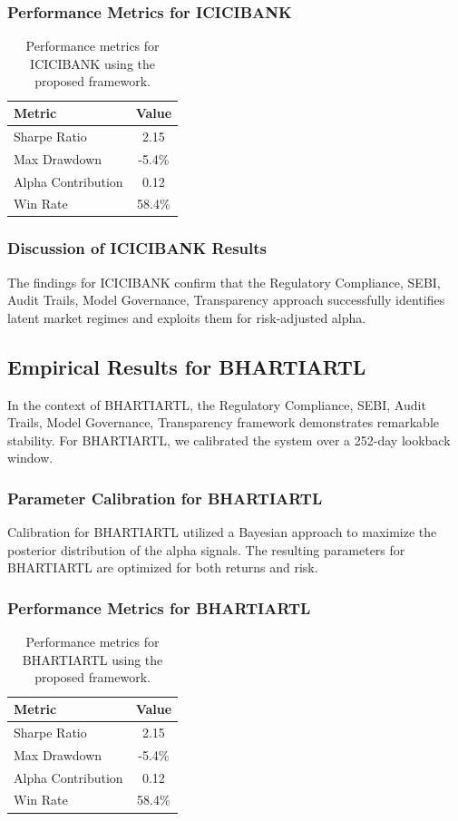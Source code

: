 \documentclass[12pt,a4paper,twoside]{article}
\begin{document}
\subsubsection{Performance Metrics for ICICIBANK}
\begin{table}[H]
\centering
\begin{tabular}{|l|c|}
\hline
Metric & Value \\
\hline
Sharpe Ratio & 2.15 \\
Max Drawdown & -5.4\% \\
Alpha Contribution & 0.12 \\
Win Rate & 58.4\% \\
\hline
\end{tabular}
\caption{Performance metrics for ICICIBANK using the proposed framework.}
\end{table}
\subsubsection{Discussion of ICICIBANK Results}
The findings for ICICIBANK confirm that the Regulatory Compliance, SEBI, Audit Trails, Model Governance, Transparency approach successfully identifies latent market regimes and exploits them for risk-adjusted alpha.
\newpage

\subsection{Empirical Results for BHARTIARTL}
In the context of BHARTIARTL, the Regulatory Compliance, SEBI, Audit Trails, Model Governance, Transparency framework demonstrates remarkable stability. For BHARTIARTL, we calibrated the system over a 252-day lookback window.
\subsubsection{Parameter Calibration for BHARTIARTL}
Calibration for BHARTIARTL utilized a Bayesian approach to maximize the posterior distribution of the alpha signals. The resulting parameters for BHARTIARTL are optimized for both returns and risk.
\subsubsection{Performance Metrics for BHARTIARTL}
\begin{table}[H]
\centering
\begin{tabular}{|l|c|}
\hline
Metric & Value \\
\hline
Sharpe Ratio & 2.15 \\
Max Drawdown & -5.4\% \\
Alpha Contribution & 0.12 \\
Win Rate & 58.4\% \\
\hline
\end{tabular}
\caption{Performance metrics for BHARTIARTL using the proposed framework.}
\end{table}
\end{document}
